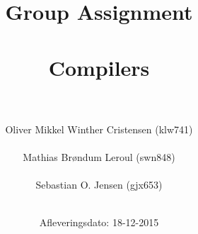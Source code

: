 \documentclass[]{article}
\title{Group Assignment\\ \ \\Compilers\\ \ \\}
\author{Oliver Mikkel Winther Cristensen (klw741) \\ \ \\Mathias Brøndum Leroul (swn848)\\ \ \\Sebastian O. Jensen (gjx653)\\ \ \\}
\date{Afleveringsdato: 18-12-2015}
\begin{document}
\maketitle
\newpage

\section*{}
\end{document}
